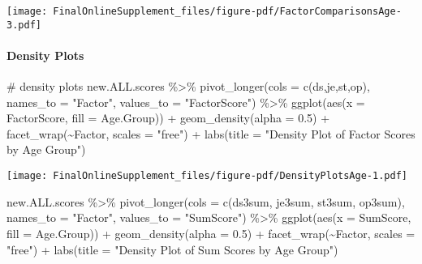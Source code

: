 \documentclass[
  letterpaper,
  DIV=11,
  numbers=noendperiod]{scrartcl}
\let\oldparagraph\paragraph
\renewcommand{\paragraph}[1]{\oldparagraph{#1}\mbox{}}
\newenvironment{Shaded}{\begin{snugshade}}{\end{snugshade}}
\newcommand{\AttributeTok}[1]{\textcolor[rgb]{0.40,0.45,0.13}{#1}}
\newcommand{\CommentTok}[1]{\textcolor[rgb]{0.37,0.37,0.37}{#1}}
\newcommand{\FloatTok}[1]{\textcolor[rgb]{0.68,0.00,0.00}{#1}}
\newcommand{\FunctionTok}[1]{\textcolor[rgb]{0.28,0.35,0.67}{#1}}
\newcommand{\NormalTok}[1]{\textcolor[rgb]{0.00,0.23,0.31}{#1}}
\newcommand{\SpecialCharTok}[1]{\textcolor[rgb]{0.37,0.37,0.37}{#1}}
\newcommand{\StringTok}[1]{\textcolor[rgb]{0.13,0.47,0.30}{#1}}
\begin{document}
\texttt{[image: FinalOnlineSupplement\_files/figure-pdf/FactorComparisonsAge-3.pdf]}

\paragraph{Density Plots}\label{density-plots}

\begin{Shaded}
\begin{Highlighting}[]
\CommentTok{\# density plots}
\NormalTok{new.ALL.scores }\SpecialCharTok{\%\textgreater{}\%}
  \FunctionTok{pivot\_longer}\NormalTok{(}\AttributeTok{cols =} \FunctionTok{c}\NormalTok{(ds,je,st,op), }
               \AttributeTok{names\_to =} \StringTok{"Factor"}\NormalTok{, }
               \AttributeTok{values\_to =} \StringTok{"FactorScore"}\NormalTok{) }\SpecialCharTok{\%\textgreater{}\%}
  \FunctionTok{ggplot}\NormalTok{(}\FunctionTok{aes}\NormalTok{(}\AttributeTok{x =}\NormalTok{ FactorScore, }
             \AttributeTok{fill =}\NormalTok{ Age.Group)) }\SpecialCharTok{+}
  \FunctionTok{geom\_density}\NormalTok{(}\AttributeTok{alpha =} \FloatTok{0.5}\NormalTok{) }\SpecialCharTok{+}
  \FunctionTok{facet\_wrap}\NormalTok{(}\SpecialCharTok{\textasciitilde{}}\NormalTok{Factor, }\AttributeTok{scales =} \StringTok{"free"}\NormalTok{) }\SpecialCharTok{+}
  \FunctionTok{labs}\NormalTok{(}\AttributeTok{title =} \StringTok{"Density Plot of Factor Scores by Age Group"}\NormalTok{)}
\end{Highlighting}
\end{Shaded}

\texttt{[image: FinalOnlineSupplement\_files/figure-pdf/DensityPlotsAge-1.pdf]}

\begin{Shaded}
\begin{Highlighting}[]
\NormalTok{new.ALL.scores }\SpecialCharTok{\%\textgreater{}\%}
  \FunctionTok{pivot\_longer}\NormalTok{(}\AttributeTok{cols =} \FunctionTok{c}\NormalTok{(ds3sum, je3sum, st3sum, op3sum), }
               \AttributeTok{names\_to =} \StringTok{"Factor"}\NormalTok{, }
               \AttributeTok{values\_to =} \StringTok{"SumScore"}\NormalTok{) }\SpecialCharTok{\%\textgreater{}\%}
  \FunctionTok{ggplot}\NormalTok{(}\FunctionTok{aes}\NormalTok{(}\AttributeTok{x =}\NormalTok{ SumScore, }
             \AttributeTok{fill =}\NormalTok{ Age.Group)) }\SpecialCharTok{+}
  \FunctionTok{geom\_density}\NormalTok{(}\AttributeTok{alpha =} \FloatTok{0.5}\NormalTok{) }\SpecialCharTok{+}
  \FunctionTok{facet\_wrap}\NormalTok{(}\SpecialCharTok{\textasciitilde{}}\NormalTok{Factor, }\AttributeTok{scales =} \StringTok{"free"}\NormalTok{) }\SpecialCharTok{+}
  \FunctionTok{labs}\NormalTok{(}\AttributeTok{title =} \StringTok{"Density Plot of Sum Scores by Age Group"}\NormalTok{)}
\end{Highlighting}
\end{Shaded}
\end{document}
